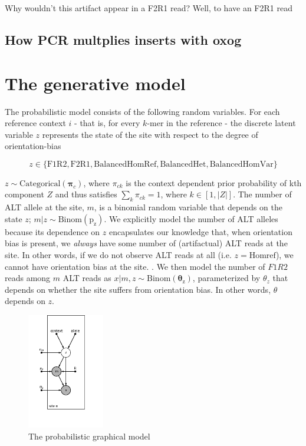 \documentclass[a4paper]{article}
\newcommand{\vpi}{{\bm \pi}}
\newcommand{\vtheta}{{\bm \theta}}
\begin{document}
Why wouldn't this artifact appear in a F2R1 read? Well, to have an F2R1 read

\subsection{How PCR multplies inserts with oxog}


\section{The generative model}

The probabilistic model consists of the following random variables. For each reference context $i$ - that is, for every $k$-mer in the reference - the discrete latent variable $z$ represents the state of the site with respect to the degree of orientation-bias 

\begin{equation*}
z \in \{ \mathrm{F1R2}, \mathrm{F2R1}, \mathrm{Balanced Hom Ref}, \mathrm{ Balanced Het }, \mathrm{ Balanced Hom Var } \}
\end{equation*}

$z \sim \mathrm{Categorical}(\vpi_c)$, where $\pi_{ck}$ is the context dependent prior probability of kth component $Z$ and thus satisfies $\sum_k \pi_{ck} = 1$, where $k \in [1, |Z|]$. The number of ALT allele at the site, $m$, is a binomial random variable that depends on the state $z$; $m|z \sim \mathrm{Binom(p_z)}$. We explicitly model the number of ALT alleles because its dependence on $z$ encapsulates our knowledge that, when orientation bias is present, we \textit{always} have some number of (artifactual) ALT reads at the site. In other words, if we do not observe ALT reads at all (i.e. $z = \mathrm{Hom ref}$), we cannot have orientation bias at the site. . We then model the number of $F1R2$ reads among $m$ ALT reads as $x|m,z \sim \mathrm{Binom(\vtheta_z)}$, parameterized by $\theta_z$ that depends on whether the site suffers from orientation bias. In other words, $\theta$ depends on $z$. 

\begin{figure}
\centering
\includegraphics[width=0.3\textwidth]{pgm.png}
\caption{\label{fig:pgm} The probabilistic graphical model}
\end{figure}
\end{document}
